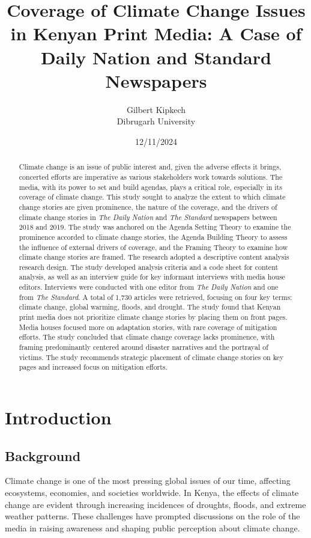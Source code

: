 \documentclass[12pt]{report}
\title{Coverage of Climate Change Issues in Kenyan Print Media: A Case of Daily Nation and Standard Newspapers}
\author{Gilbert Kipkech \\ Dibrugarh University}
\date{12/11/2024}
\begin{document}
\maketitle

\begin{abstract}
    Climate change is an issue of public interest and, given the adverse effects it brings, concerted efforts are imperative as various stakeholders work towards solutions. The media, with its power to set and build agendas, plays a critical role, especially in its coverage of climate change. This study sought to analyze the extent to which climate change stories are given prominence, the nature of the coverage, and the drivers of climate change stories in \textit{The Daily Nation} and \textit{The Standard} newspapers between 2018 and 2019. The study was anchored on the Agenda Setting Theory to examine the prominence accorded to climate change stories, the Agenda Building Theory to assess the influence of external drivers of coverage, and the Framing Theory to examine how climate change stories are framed. The research adopted a descriptive content analysis research design. The study developed analysis criteria and a code sheet for content analysis, as well as an interview guide for key informant interviews with media house editors. Interviews were conducted with one editor from \textit{The Daily Nation} and one from \textit{The Standard}. A total of 1,730 articles were retrieved, focusing on four key terms: climate change, global warming, floods, and drought. The study found that Kenyan print media does not prioritize climate change stories by placing them on front pages. Media houses focused more on adaptation stories, with rare coverage of mitigation efforts. The study concluded that climate change coverage lacks prominence, with framing predominantly centered around disaster narratives and the portrayal of victims. The study recommends strategic placement of climate change stories on key pages and increased focus on mitigation efforts.
\end{abstract}

\chapter{Introduction}
\section{Background}
    Climate change is one of the most pressing global issues of our time, affecting ecosystems, economies, and societies worldwide. In Kenya, the effects of climate change are evident through increasing incidences of droughts, floods, and extreme weather patterns. These challenges have prompted discussions on the role of the media in raising awareness and shaping public perception about climate change.
\end{document}
